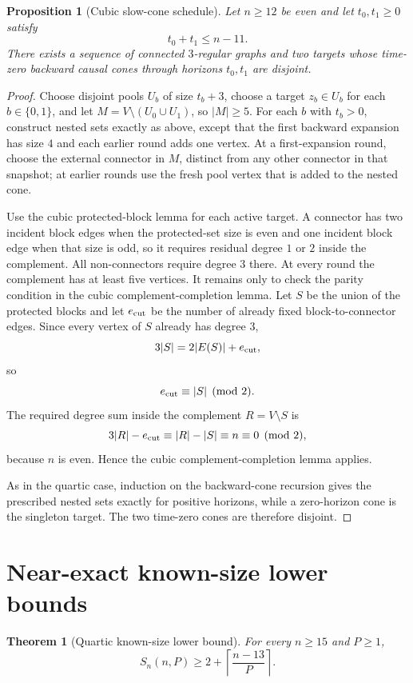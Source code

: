 \documentclass[11pt]{article}
\newtheorem{theorem}{Theorem}
\newtheorem{proposition}{Proposition}
\theoremstyle{remark}
\begin{document}
\begin{proposition}[Cubic slow-cone schedule]
Let $n\ge12$ be even and let $t_0,t_1\ge0$ satisfy
\[
t_0+t_1\le n-11.
\]
There exists a sequence of connected $3$-regular graphs and two targets whose
time-zero backward causal cones through horizons $t_0,t_1$ are disjoint.
\end{proposition}

\begin{proof}
Choose disjoint pools $U_b$ of size $t_b+3$, choose a target
$z_b\in U_b$ for each $b\in\{0,1\}$, and let
$M=V\setminus(U_0\cup U_1)$, so $|M|\ge5$.
For each $b$ with $t_b>0$, construct nested sets exactly as above, except that
the first backward expansion has size $4$ and each earlier round adds one vertex.
At a first-expansion round, choose the external connector in $M$, distinct from
any other connector in that snapshot; at earlier rounds use the fresh pool vertex
that is added to the nested cone.

Use the cubic protected-block lemma for each active target.  A connector has
two incident block edges when the protected-set size is even and one incident
block edge when that size is odd, so it requires residual degree $1$ or $2$
inside the complement.  All non-connectors require degree $3$ there.
At every round the complement has at least five vertices.  It remains only
to check the parity condition in the cubic complement-completion lemma.
Let $S$ be the union of the protected blocks and let $e_{\rm cut}$ be the
number of already fixed block-to-connector edges.  Since every vertex of $S$
already has degree $3$,
\[
3|S|=2|E(S)|+e_{\rm cut},
\]
so
\[
e_{\rm cut}\equiv |S|\pmod 2.
\]
The required degree sum inside the complement $R=V\setminus S$ is
\[
3|R|-e_{\rm cut}
\equiv |R|-|S|
\equiv n
\equiv0\pmod2,
\]
because $n$ is even.  Hence the cubic complement-completion lemma applies.

As in the quartic case, induction on the backward-cone recursion gives the
prescribed nested sets exactly for positive horizons, while a zero-horizon cone is
the singleton target.  The two time-zero cones are therefore disjoint.
\end{proof}

\section{Near-exact known-size lower bounds}

\begin{theorem}[Quartic known-size lower bound]
For every $n\ge15$ and $P\ge1$,
\[
\boxed{
S_n(n,P)\ge
2+\left\lceil\frac{n-13}{P}\right\rceil.
}
\]
\end{theorem}
\end{document}
